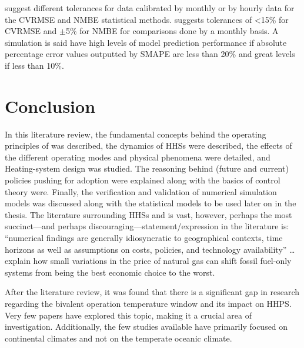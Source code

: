  \cite{ashrae_guideline_project_committee_14_ashrae_2014} suggest different tolerances for data calibrated by monthly or by hourly data for the \ac{CVRMSE} and \ac{NMBE} statistical methods.  suggests tolerances of <15\% for \ac{CVRMSE} and $\pm$5\% for \ac{NMBE} for comparisons done by a monthly basis. A simulation is said have high levels of model prediction performance if absolute percentage error values outputted by \ac{SMAPE} are less than 20\% and great levels if less than 10\%. 


\section{Conclusion}
In this literature review, the fundamental concepts behind the operating principles of \HPs was described, the dynamics of \acp{HHS} were described, the effects of the different operating modes and physical phenomena were detailed, and Heating-system design was studied. The reasoning behind (future and current) policies pushing for \HP adoption were explained along with the basics of control theory were. Finally, the verification and validation of numerical simulation models was discussed along with the statistical models to be used later on in the thesis. The literature surrounding \acp{HHS} and \HPs is vast, however, perhaps the most succinct---and perhaps discouraging---statement/expression in the literature is: ``numerical findings are generally idiosyncratic to geographical contexts, time horizons as well as assumptions on costs, policies, and technology availability'' \cite{bloess_power--heat_2018}\ldots\ \citeauthor{rauschkolb_cost-optimal_2020} \cite{rauschkolb_cost-optimal_2020} explain how small variations in the price of natural gas can shift fossil fuel-only systems from being the best economic choice to the worst. 

After the literature review, it was found that there is a significant gap in research regarding the bivalent operation temperature window and its impact on \acs{HHPS}. Very few papers have explored this topic, making it a crucial area of investigation. Additionally, the few studies available have primarily focused on continental climates and not on the temperate oceanic climate. 

